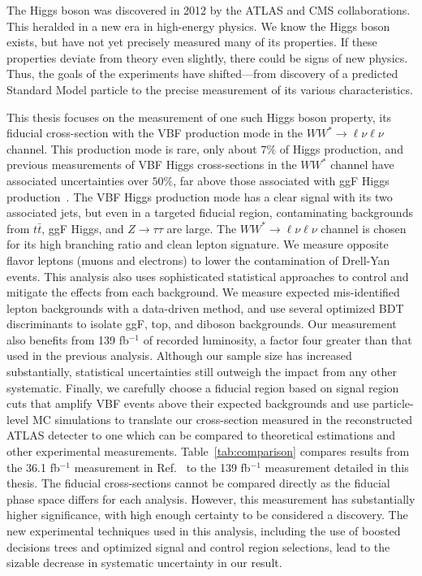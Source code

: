 The Higgs boson was discovered in 2012 by the ATLAS and CMS collaborations. This heralded in a new era in high-energy physics. We know the Higgs boson exists, but have not yet precisely measured many of its properties. If these properties deviate from theory even slightly, there could be signs of new physics. Thus, the goals of the experiments have shifted---from discovery of a predicted Standard Model particle to the precise measurement of its various characteristics. 

This thesis focuses on the measurement of one such Higgs boson property, its fiducial cross-section with the VBF production mode in the $WW^*\rightarrow\ell\nu\ell\nu$ channel. This production mode is rare, only about $7\%$ of Higgs production, and previous measurements of VBF Higgs cross-sections in the $WW^*$ channel have associated uncertainties over $50\%$, far above those associated with ggF Higgs production~\cite{HWW2016}. The VBF Higgs production mode has a clear signal with its two associated jets, but even in a targeted fiducial region, contaminating backgrounds from $t\bar{t}$, ggF Higgs, and $Z\rightarrow\tau\tau$ are large. The $WW^*\rightarrow \ell\nu\ell\nu$ channel is chosen for its high branching ratio and clean lepton signature. We measure opposite flavor leptons (muons and electrons) to lower the contamination of Drell-Yan events. This analysis also uses sophisticated statistical approaches to control and mitigate the effects from each background. We measure expected mis-identified lepton backgrounds with a data-driven method, and use several optimized BDT discriminants to isolate ggF, top, and diboson backgrounds. Our measurement also benefits from 139 fb$^{-1}$ of recorded luminosity, a factor four greater than that used in the previous analysis. Although our sample size has increased substantially, statistical uncertainties still outweigh the impact from any other systematic. Finally, we carefully choose a fiducial region based on signal region cuts that amplify VBF events above their expected backgrounds and use particle-level MC simulations to translate our cross-section measured in the reconstructed ATLAS detecter to one which can be compared to theoretical estimations and other experimental measurements. Table~\ref{tab:comparison} compares results from the 36.1 fb$^{-1}$ measurement in Ref.~\cite{HWW2016} to the 139 fb$^{-1}$ measurement detailed in this thesis. The fiducial cross-sections cannot be compared directly as the fiducial phase space differs for each analysis. However, this measurement has substantially higher significance, with high enough certainty to be considered a discovery. The new experimental techniques used in this analysis, including the use of boosted decisions trees and optimized signal and control region selections, lead to the sizable decrease in systematic uncertainty in our result. 

